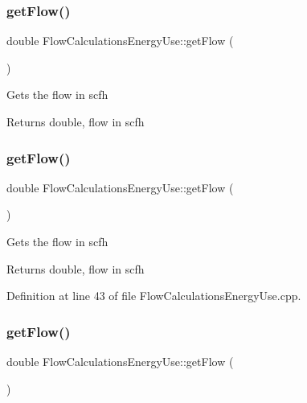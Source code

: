 \subsubsection{\texorpdfstring{get\+Flow()}{getFlow()}\hspace{0.1cm}{\footnotesize\ttfamily [1/3]}}
{\footnotesize\ttfamily double Flow\+Calculations\+Energy\+Use\+::get\+Flow (\begin{DoxyParamCaption}{ }\end{DoxyParamCaption})}

Gets the flow in scfh

\begin{DoxyReturn}{Returns}
double, flow in scfh 
\end{DoxyReturn}
\mbox{\label{class_flow_calculations_energy_use_a6b892e984bd09e821cb642f8f8efd221}} 
\subsubsection{\texorpdfstring{get\+Flow()}{getFlow()}\hspace{0.1cm}{\footnotesize\ttfamily [2/3]}}
{\footnotesize\ttfamily double Flow\+Calculations\+Energy\+Use\+::get\+Flow (\begin{DoxyParamCaption}{ }\end{DoxyParamCaption})}

Gets the flow in scfh

\begin{DoxyReturn}{Returns}
double, flow in scfh 
\end{DoxyReturn}


Definition at line 43 of file Flow\+Calculations\+Energy\+Use.\+cpp.

\mbox{\label{class_flow_calculations_energy_use_a6b892e984bd09e821cb642f8f8efd221}} 
\subsubsection{\texorpdfstring{get\+Flow()}{getFlow()}\hspace{0.1cm}{\footnotesize\ttfamily [3/3]}}
{\footnotesize\ttfamily double Flow\+Calculations\+Energy\+Use\+::get\+Flow (\begin{DoxyParamCaption}{ }\end{DoxyParamCaption})}

